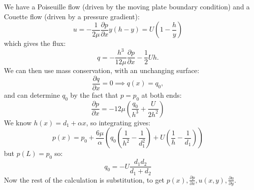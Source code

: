 \documentclass[../Main.tex]{subfiles}
\begin{document}
We have a Poiseuille flow (driven by the moving plate boundary condition) and a Couette flow (driven by a pressure gradient):
\begin{equation*}
    u = -\frac{1}{2\mu} \frac{\partial p}{\partial x} y(h-y) = U \left(1 - \frac{h}{y}\right)
\end{equation*}
which gives the flux:
\begin{equation*}
    q = -\frac{h^3}{12\mu} \frac{\partial p}{\partial x} - \frac12 U h.
\end{equation*}
We can then use mass conservation, with an unchanging surface:
\begin{equation*}
    \frac{\partial q}{\partial x} = 0 \implies q(x) = q_0,
\end{equation*}
and can determine $q_0$ by the fact that $p = p_0$ at both ends:
\begin{equation*}
    \frac{\partial p}{\partial x} = -12\mu \left(\frac{q_0}{h^3} + \frac{U}{2h^2}\right)
\end{equation*}
We know $h(x) = d_1 + \alpha x$, so integrating gives:
\begin{equation*}
    p(x) = p_0 + \frac{6\mu}{\alpha} \left(q_0 \left(\frac{1}{h^2} - \frac{1}{d_1^2}\right) + U\left(\frac{1}{h}- \frac{1}{d_1}\right)\right)
\end{equation*}
but $p(L) = p_0$ so:
\begin{equation*}
    q_0 = -U \frac{d_1d_2}{d_1 + d_2}
\end{equation*}
Now the rest of the calculation is substitution, to get $p(x), \frac{\partial p}{\partial x}, u(x, y), \frac{\partial u}{\partial y}$.
\end{document}
